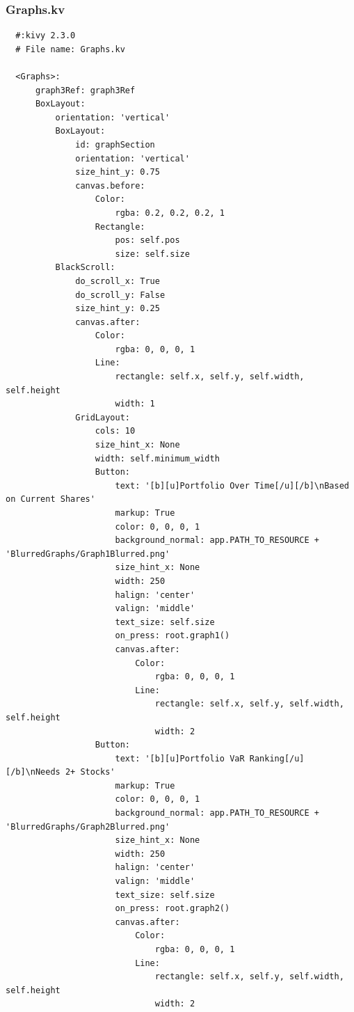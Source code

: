 \documentclass{article}
\begin{document}
\subsubsection{Graphs.kv}
\begin{verbatim}
  #:kivy 2.3.0
  # File name: Graphs.kv

  <Graphs>:
      graph3Ref: graph3Ref
      BoxLayout:
          orientation: 'vertical'
          BoxLayout:
              id: graphSection
              orientation: 'vertical'
              size_hint_y: 0.75
              canvas.before:
                  Color:
                      rgba: 0.2, 0.2, 0.2, 1
                  Rectangle:
                      pos: self.pos
                      size: self.size
          BlackScroll:
              do_scroll_x: True
              do_scroll_y: False
              size_hint_y: 0.25
              canvas.after:
                  Color:
                      rgba: 0, 0, 0, 1
                  Line:
                      rectangle: self.x, self.y, self.width, self.height
                      width: 1
              GridLayout:
                  cols: 10
                  size_hint_x: None
                  width: self.minimum_width
                  Button:
                      text: '[b][u]Portfolio Over Time[/u][/b]\nBased on Current Shares'
                      markup: True
                      color: 0, 0, 0, 1
                      background_normal: app.PATH_TO_RESOURCE + 'BlurredGraphs/Graph1Blurred.png'
                      size_hint_x: None
                      width: 250
                      halign: 'center'
                      valign: 'middle'
                      text_size: self.size
                      on_press: root.graph1()
                      canvas.after:
                          Color:
                              rgba: 0, 0, 0, 1
                          Line:
                              rectangle: self.x, self.y, self.width, self.height
                              width: 2
                  Button:
                      text: '[b][u]Portfolio VaR Ranking[/u][/b]\nNeeds 2+ Stocks'
                      markup: True
                      color: 0, 0, 0, 1
                      background_normal: app.PATH_TO_RESOURCE + 'BlurredGraphs/Graph2Blurred.png'
                      size_hint_x: None
                      width: 250
                      halign: 'center'
                      valign: 'middle'
                      text_size: self.size
                      on_press: root.graph2()
                      canvas.after:
                          Color:
                              rgba: 0, 0, 0, 1
                          Line:
                              rectangle: self.x, self.y, self.width, self.height
                              width: 2


\end{verbatim}
\end{document}
